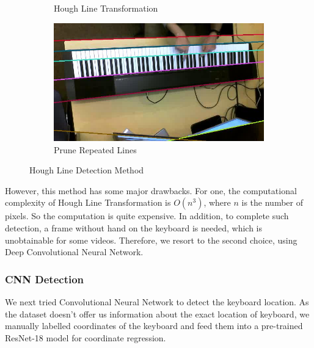 \documentclass[10pt,twocolumn,letterpaper]{article}
\begin{document}
\begin{figure}[h!]
\begin{subfigure}{0.23\textwidth}
        \caption{Hough Line Transformation} \label{fig:d}
      \end{subfigure}\hspace*{\fill}
      \begin{subfigure}{0.23\textwidth}
        \includegraphics[width=\linewidth]{fig/6.jpg}
        \caption{Prune Repeated Lines} \label{fig:e}
      \end{subfigure}
      
      \caption{Hough Line Detection Method} \label{fig:1}
\end{figure}

However, this method has some major drawbacks. 
For one, the computational complexity of Hough Line Transformation is $O(n^3)$, where $n$ is the number of pixels. 
So the computation is quite expensive.
In addition, to complete such detection, a frame without hand on the keyboard is needed, which is unobtainable for some videos.
Therefore, we resort to the second choice, using Deep Convolutional Neural Network.

\subsubsection{CNN Detection}

We next tried Convolutional Neural Network to detect the keyboard location. 
As the dataset doesn't offer us information about the exact location of keyboard, we manually labelled coordinates of the keyboard and feed them into a pre-trained ResNet-18 \cite{resnet} model for coordinate regression.
\end{document}
